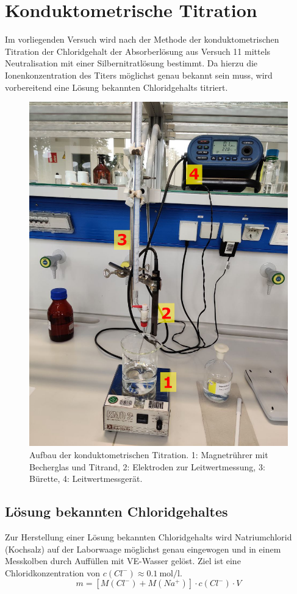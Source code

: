 	\section{Konduktometrische Titration}\label{sec:titration}
		Im vorliegenden Versuch wird nach der Methode der konduktometrischen Titration der Chloridgehalt der Absorberlösung aus Versuch 11 mittels Neutralisation mit
		einer Silbernitratlösung bestimmt. Da hierzu die Ionenkonzentration des Titers möglichst genau bekannt sein muss, wird vorbereitend eine Lösung bekannten Chloridgehalts
		titriert. \nocite{Analytische.Chemie.I.Ritgen.2019}
		\begin{figure}[h]
			\centering
			\includegraphics[width=.7\textwidth]{assets/photos/aufbau1_edit.jpg}
			\caption[aufbau Titration]{Aufbau der konduktometrischen Titration. 1: Magnetrührer mit Becherglas und Titrand, 2: Elektroden zur Leitwertmessung, 3: Bürette, 4: Leitwertmessgerät.}
			\label{fig:aufbau titration}
		\end{figure}
		\subsection{Lösung bekannten Chloridgehaltes}\label{sec:bekannter chloridgehalt}
			Zur Herstellung einer Lösung bekannten Chloridgehalts wird Natriumchlorid (Kochsalz) auf der Laborwaage möglichst genau eingewogen
			und in einem Messkolben durch Auffüllen mit VE-Wasser gelöst. Ziel ist eine Chloridkonzentration von \(c(Cl^{-}) \approx \SI{0,1}{\mole\per\litre}\).
			\begin{equation}
				m = \left[M(Cl^{-}) + M(Na^{+})\right] \cdot c(Cl^{-}) \cdot V
				\label{eq:masse NaCl}
			\end{equation}

